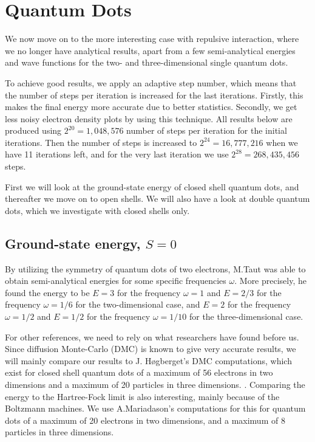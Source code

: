 \newpage
\section{Quantum Dots}
We now move on to the more interesting case with repulsive interaction, where we no longer have analytical results, apart from a few semi-analytical energies and wave functions  for the two- and three-dimensional single quantum dots.

To achieve good results, we apply an adaptive step number, which means that the number of steps per iteration is increased for the last iterations. Firstly, this makes the final energy more accurate due to better statistics. Secondly, we get less noisy electron density plots by using this technique. All results below are produced using $2^{20}=1,048,576$ number of steps per iteration for the initial iterations. Then the number of steps is increased to $2^{24}=16,777,216$ when we have 11 iterations left, and for the very last iteration we use $2^{28}=268,435,456$ steps.

First we will look at the ground-state energy of closed shell quantum dots, and thereafter we move on to open shells. We will also have a look at double quantum dots, which we investigate with closed shells only.

\subsection{Ground-state energy, $S=0$}
By utilizing the symmetry of quantum dots of two electrons, M.Taut was able to obtain semi-analytical energies for some specific frequencies $\omega$. More precisely, he found the energy to be $E=3$ for the frequency $\omega=1$ and $E=2/3$ for the frequency $\omega=1/6$ for the two-dimensional case, and $E=2$ for the frequency $\omega=1/2$ and $E=1/2$ for the frequency $\omega=1/10$ for the three-dimensional case. \cite{taut_two_1993}\cite{taut_two_1994}

For other references, we need to rely on what researchers have found before us. Since diffusion Monte-Carlo (DMC) is known to give very accurate results, we will mainly compare our results to J. Høgberget's DMC computations, which exist for closed shell quantum dots of a maximum of 56 electrons in two dimensions and a maximum of 20 particles in three dimensions. \cite{hogberget_quantum_2013}. Comparing the energy to the Hartree-Fock limit is also interesting, mainly because of the Boltzmann machines. We use A.Mariadason's computations for this for quantum dots of a maximum of 20 electrons in two dimensions, and a maximum of 8 particles in three dimensions. \cite{mariadason_quantum_2018}

